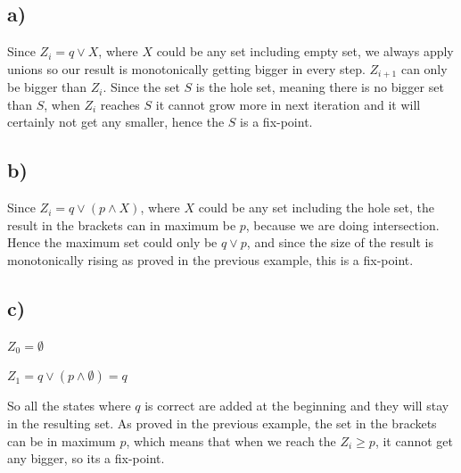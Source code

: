 \documentclass[a4paper]{article}
\begin{document}
\subsection*{a)}

Since $Z_i = q \lor X$, where $X$ could be any set including empty set, we always apply unions so our result is monotonically getting bigger in every step. $Z_{i+1}$ can only be bigger than $Z_i$. Since the set $S$ is the hole set, meaning there is no bigger set than $S$, when $Z_i$ reaches $S$ it cannot grow more in next iteration and it will certainly not get any smaller, hence the $S$ is a fix-point.

\subsection*{b)}

Since $Z_i=q \lor (p \land X)$, where $X$ could be any set including the hole set, the result in the brackets can in maximum be $p$, because we are doing intersection. Hence the maximum set could only be $q \lor p$, and since the size of the result is monotonically rising as proved in the previous example, this is a fix-point. 

\subsection*{c)}

$Z_0=\emptyset$

$Z_1=q \lor ( p \land \emptyset )=q$

So all the states where $q$ is correct are added at the beginning and they will stay in the resulting set. As proved in the previous example, the set in the brackets can be in maximum $p$, which means that when we reach the $Z_i \geq p$, it cannot get any bigger, so its a fix-point.
\end{document}
